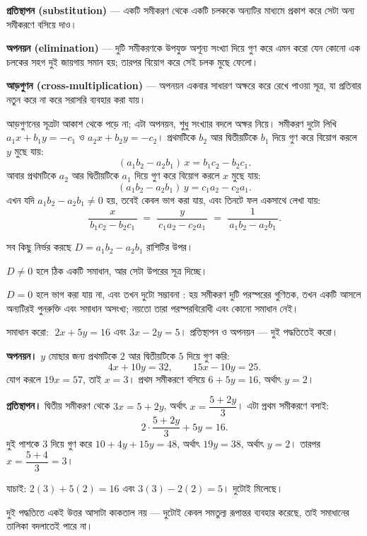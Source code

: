 \documentclass[11pt]{article}
\begin{document}
\begin{idea}[তিনটি পদ্ধতি, একই ভাবনা]
\textbf{প্রতিস্থাপন (substitution)} --- একটি সমীকরণ থেকে একটি চলককে অন্যটির
মাধ্যমে প্রকাশ করে সেটা অন্য সমীকরণে বসিয়ে দাও।

\textbf{অপনয়ন (elimination)} --- দুটি সমীকরণকে উপযুক্ত অশূন্য সংখ্যা দিয়ে গুণ
করে এমন করো যেন কোনো এক চলকের সহগ দুই জায়গায় সমান হয়; তারপর বিয়োগ করে সেই চলক
মুছে ফেলো।

\textbf{আড়গুণন (cross-multiplication)} --- অপনয়ন একবার সাধারণ অক্ষরে করে রেখে
পাওয়া সূত্র, যা প্রতিবার নতুন করে না করে সরাসরি ব্যবহার করা যায়।
\end{idea}

\noindent
আড়গুণনের সূত্রটা আকাশ থেকে পড়ে না; এটা অপনয়ন, শুধু সংখ্যার বদলে অক্ষর নিয়ে।
সমীকরণ দুটো লিখি $a_1x + b_1y = -c_1$ ও $a_2x + b_2y = -c_2$। প্রথমটিকে $b_2$
আর দ্বিতীয়টিকে $b_1$ দিয়ে গুণ করে বিয়োগ করলে $y$ মুছে যায়:
\[
  (a_1b_2 - a_2b_1)\,x = b_1c_2 - b_2c_1 .
\]
আবার প্রথমটিকে $a_2$ আর দ্বিতীয়টিকে $a_1$ দিয়ে গুণ করে বিয়োগ করলে $x$ মুছে যায়:
\[
  (a_1b_2 - a_2b_1)\,y = c_1a_2 - c_2a_1 .
\]
এখন যদি $a_1b_2 - a_2b_1 \neq 0$ হয়, তবেই কেবল ভাগ করা যায়, এবং তিনটে ফল একসাথে
লেখা যায়:
\[
  \frac{x}{\,b_1c_2 - b_2c_1\,} \;=\; \frac{y}{\,c_1a_2 - c_2a_1\,}
  \;=\; \frac{1}{\,a_1b_2 - a_2b_1\,} .
\]

\begin{idea}[কখন সমাধান আছে]
সব কিছু নির্ভর করছে $D = a_1b_2 - a_2b_1$ রাশিটির উপর।

$D \neq 0$ হলে ঠিক একটি সমাধান, আর সেটা উপরের সূত্র দিচ্ছে।

$D = 0$ হলে ভাগ করা যায় না, এবং তখন দুটো সম্ভাবনা :  হয় সমীকরণ দুটি পরস্পরের
গুণিতক, তখন একটি আসলে অন্যটিরই পুনরুক্তি এবং সমাধান অসংখ্য; নয়তো তারা পরস্পরবিরোধী
এবং কোনো সমাধান নেই।
\end{idea}

\begin{example}
সমাধান করো: $\;2x + 5y = 16$ এবং $3x - 2y = 5$। প্রতিস্থাপন ও অপনয়ন --- দুই
পদ্ধতিতেই করো।
\end{example}

\begin{solbox}
\textbf{অপনয়ন।} $y$ মোছার জন্য প্রথমটিকে $2$ আর দ্বিতীয়টিকে $5$ দিয়ে গুণ করি:
\[
  4x + 10y = 32, \qquad 15x - 10y = 25 .
\]
যোগ করলে $19x = 57$, তাই $x = 3$। প্রথম সমীকরণে বসিয়ে $6 + 5y = 16$, অর্থাৎ
$y = 2$।

\medskip
\textbf{প্রতিস্থাপন।} দ্বিতীয় সমীকরণ থেকে $3x = 5 + 2y$, অর্থাৎ
$x = \dfrac{5 + 2y}{3}$। এটা প্রথম সমীকরণে বসাই:
\[
  2 \cdot \frac{5 + 2y}{3} + 5y = 16 .
\]
দুই পাশকে $3$ দিয়ে গুণ করে $10 + 4y + 15y = 48$, অর্থাৎ $19y = 38$, অর্থাৎ
$y = 2$। তারপর $x = \dfrac{5 + 4}{3} = 3$।

\medskip
যাচাই: $2(3) + 5(2) = 16$ এবং $3(3) - 2(2) = 5$। দুটোই মিলেছে।

দুই পদ্ধতিতে একই উত্তর আসাটা কাকতাল নয় --- দুটোই কেবল সমতুল্য রূপান্তর ব্যবহার
করেছে, তাই সমাধানের তালিকা বদলাতেই পারে না।
\end{solbox}
\end{document}
